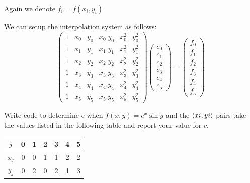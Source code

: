 \documentclass[a4paper, oneside]{article}
\begin{document}
\begin{solution}
    Again we denote $f_i = f(x_i, y_i)$

    We can setup the interpolation system as follows:
    \begin{equation}
        \begin{pmatrix}
            1 & x_0 & y_0 & x_0.y_0 & x_0^2 & y_0^2 \\
            1 & x_1 & y_1 & x_1.y_1 & x_1^2 & y_1^2 \\
            1 & x_2 & y_2 & x_2.y_2 & x_2^2 & y_2^2 \\
            1 & x_3 & y_3 & x_3.y_3 & x_3^2 & y_3^2 \\
            1 & x_4 & y_4 & x_4.y_4 & x_4^2 & y_4^2 \\
            1 & x_5 & y_5 & x_5.y_5 & x_5^2 & y_5^2
        \end{pmatrix}
        \begin{pmatrix}
            c_0 \\ c_1 \\ c_2 \\ c_3 \\ c_4 \\ c_5
        \end{pmatrix}
        =
        \begin{pmatrix}
            f_0 \\ f_1 \\ f_2 \\ f_3 \\ f_4 \\ f_5
        \end{pmatrix}
    \end{equation}
\end{solution}
\begin{problem}
    Write code to determine c when $f(x, y) = e^x \sin y$ and the $\left\langle xi, yi\right\rangle$ pairs take the values listed in the following table and report your value for $c$.
    \begin{table}[h]
        \centering
        \begin{tabular}{c|c c c c c c}
            \hline
            $j$ & 0 & 1 & 2 & 3 & 4 & 5 \\
            \hline
            $x_j$ & 0 & 0 & 1 & 1 & 2 & 2 \\
            $y_j$ & 0 & 2 & 0 & 2 & 1 & 3 \\
            \hline
        \end{tabular}
    \end{table}
\end{problem}
\end{document}
